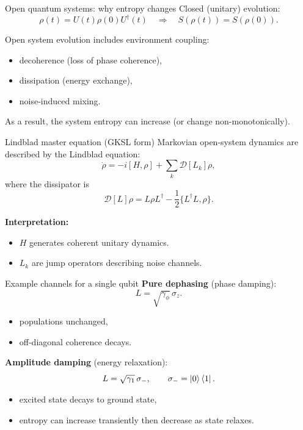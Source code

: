 \documentclass[aspectratio=169]{beamer}
\begin{document}
\begin{frame}{Open quantum systems: why entropy changes}
Closed (unitary) evolution:
\[
\rho(t)=U(t)\rho(0)U^\dagger(t)\quad \Rightarrow\quad S(\rho(t))=S(\rho(0)).
\]

\medskip
Open system evolution includes environment coupling:
\begin{itemize}
\item decoherence (loss of phase coherence),
\item dissipation (energy exchange),
\item noise-induced mixing.
\end{itemize}

\medskip
As a result, the system entropy can increase (or change non-monotonically).
\end{frame}

\begin{frame}{Lindblad master equation (GKSL form)}
Markovian open-system dynamics are described by the Lindblad equation:
\[
\dot{\rho} = -i[H,\rho] + \sum_k \mathcal{D}[L_k]\rho,
\]
where the dissipator is
\[
\mathcal{D}[L]\rho = L\rho L^\dagger - \frac{1}{2}\{L^\dagger L,\rho\}.
\]

\medskip
\textbf{Interpretation:}
\begin{itemize}
\item $H$ generates coherent unitary dynamics.
\item $L_k$ are jump operators describing noise channels.
\end{itemize}
\end{frame}

\begin{frame}{Example channels for a single qubit}
\textbf{Pure dephasing} (phase damping):
\[
L=\sqrt{\gamma_\phi}\,\sigma_z.
\]
\begin{itemize}
\item populations unchanged,
\item off-diagonal coherence decays.
\end{itemize}

\medskip
\textbf{Amplitude damping} (energy relaxation):
\[
L=\sqrt{\gamma_1}\,\sigma_-,
\qquad
\sigma_-=\ket{0}\bra{1}.
\]
\begin{itemize}
\item excited state decays to ground state,
\item entropy can increase transiently then decrease as state relaxes.
\end{itemize}
\end{frame}
\end{document}
